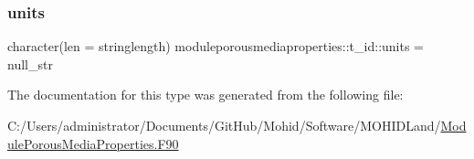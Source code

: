 \mbox{\label{structmoduleporousmediaproperties_1_1t__id_ad6e7f6a6a0fb30727fe956fa92dd29e3}} 
\subsubsection{\texorpdfstring{units}{units}}
{\footnotesize\ttfamily character(len = stringlength) moduleporousmediaproperties\+::t\+\_\+id\+::units = null\+\_\+str\hspace{0.3cm}{\ttfamily [private]}}



The documentation for this type was generated from the following file\+:\begin{DoxyCompactItemize}
\item 
C\+:/\+Users/administrator/\+Documents/\+Git\+Hub/\+Mohid/\+Software/\+M\+O\+H\+I\+D\+Land/\mbox{\hyperlink{_module_porous_media_properties_8_f90}{Module\+Porous\+Media\+Properties.\+F90}}\end{DoxyCompactItemize}
